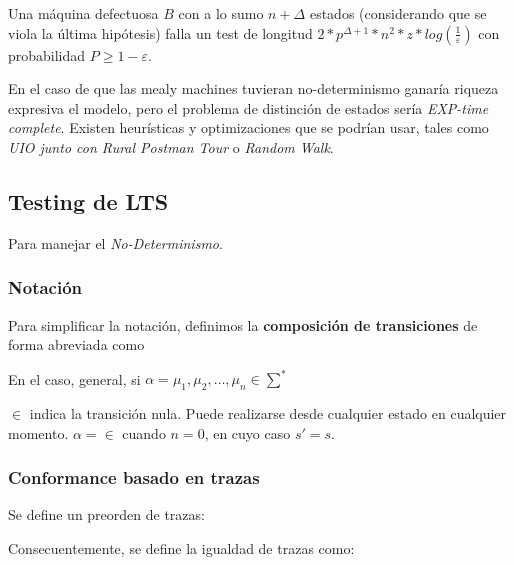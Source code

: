 \documentclass[]{article}
\begin{document}
Una máquina defectuosa $B$ con a lo sumo $\displaystyle n+\Delta$ estados (considerando que se viola la última hipótesis) falla un test de longitud $\displaystyle 2*p^{\Delta+1}*n^2*z*log(\frac{1}{\varepsilon})$ con probabilidad $\displaystyle P \geq 1-\varepsilon$.

En el caso de que las mealy machines tuvieran no-determinismo ganaría riqueza expresiva el modelo, pero el problema de distinción de estados sería \textit{EXP-time complete}. Existen heurísticas y optimizaciones que se podrían usar, tales como \textit{UIO junto con Rural Postman Tour} o \textit{Random Walk}.

\subsection{Testing de LTS}
Para manejar el \emph{No-Determinismo}.

\subsubsection{Notación}
Para simplificar la notación, definimos la \textbf{composición de transiciones} de forma abreviada como
\begin{center}
\end{center}

En el caso, general, si $\alpha=\mu_1,\mu_2,\hdots,\mu_n\in\sum^*$
\begin{center}
\end{center}

$\in$ indica la transición nula. Puede realizarse desde cualquier estado en cualquier momento. $\displaystyle \alpha = \in$ cuando $n=0$, en cuyo caso $s'=s$.

\subsubsection{Conformance basado en trazas}
Se define un preorden de trazas:
\begin{center}
\end{center}

Consecuentemente, se define la igualdad de trazas como:
\begin{center}
\end{center}
\end{document}
